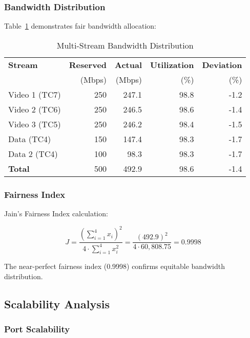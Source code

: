 \documentclass[10pt, journal, compsoc]{IEEEtran}
\begin{document}
\subsubsection{Bandwidth Distribution}

Table~\ref{tab:fairness} demonstrates fair bandwidth allocation:

\begin{table}[h]
\centering
\caption{Multi-Stream Bandwidth Distribution}
\label{tab:fairness}
\begin{tabular}{lrrrr}
\toprule
\textbf{Stream} & \textbf{Reserved} & \textbf{Actual} & \textbf{Utilization} & \textbf{Deviation} \\
 & (Mbps) & (Mbps) & (\%) & (\%) \\
\midrule
Video 1 (TC7) & 250 & 247.1 & 98.8 & -1.2 \\
Video 2 (TC6) & 250 & 246.5 & 98.6 & -1.4 \\
Video 3 (TC5) & 250 & 246.2 & 98.4 & -1.5 \\
Data (TC4) & 150 & 147.4 & 98.3 & -1.7 \\
Data 2 (TC4) & 100 & 98.3 & 98.3 & -1.7 \\
\midrule
\textbf{Total} & 500 & 492.9 & 98.6 & -1.4 \\
\bottomrule
\end{tabular}
\end{table}

\subsubsection{Fairness Index}

Jain's Fairness Index calculation:

\begin{equation}
J = \frac{(\sum_{i=1}^{4} x_i)^2}{4 \cdot \sum_{i=1}^{4} x_i^2} = \frac{(492.9)^2}{4 \cdot 60,808.75} = 0.9998
\end{equation}

The near-perfect fairness index (0.9998) confirms equitable bandwidth distribution.

\subsection{Scalability Analysis}

\subsubsection{Port Scalability}
\end{document}
